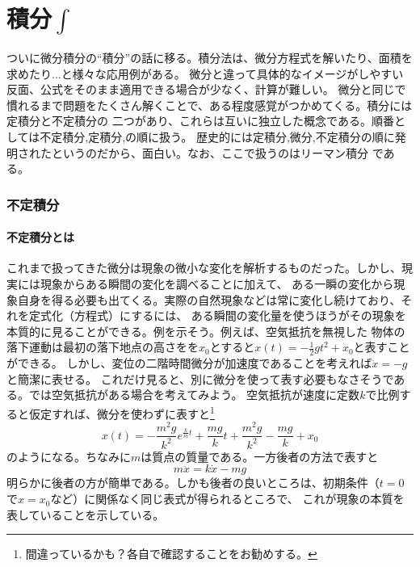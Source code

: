 \documentclass[a4j,dvipdfmx]{jsarticle}
\newcommand{\linktoMOKUZI}{\vspace{\stretch{1}}\fbox{\centerline{\hyperref[目次]{目次に戻る}}}}
\begin{document}
            \linktoMOKUZI
    \clearpage

    \part{積分$\int$}
        \begin{screen}
            ついに微分積分の``積分''の話に移る。積分法は、微分方程式を解いたり、面積を求めたり...と様々な応用例がある。
            微分と違って具体的なイメージがしやすい反面、公式をそのまま適用できる場合が少なく、計算が難しい。
            微分と同じで慣れるまで問題をたくさん解くことで、ある程度感覚がつかめてくる。積分には定積分と不定積分の
            二つがあり、これらは互いに独立した概念である。順番としては不定積分,定積分,の順に扱う。
            歴史的には定積分,微分,不定積分の順に発明されたというのだから、面白い。なお、ここで扱うのはリーマン積分
            である。
        \end{screen}
        \clearpage
        \section{不定積分}
            \subsection{不定積分とは}
                これまで扱ってきた微分は現象の微小な変化を解析するものだった。しかし、現実には現象からある瞬間の変化を調べることに加えて、
                ある一瞬の変化から現象自身を得る必要も出てくる。実際の自然現象などは常に変化し続けており、それを定式化（方程式）にするには、
                ある瞬間の変化量を使うほうがその現象を本質的に見ることができる。例を示そう。例えば、空気抵抗を無視した
                物体の落下運動は最初の落下地点の高さをを$x_0$とすると$x(t)=-\frac{1}{2}gt^2+x_0$と表すことができる。
                しかし、変位の二階時間微分が加速度であることを考えれば$\ddot{x}=-g$と簡潔に表せる。
                これだけ見ると、別に微分を使って表す必要もなさそうである。では空気抵抗がある場合を考えてみよう。
                空気抵抗が速度に定数$k$で比例すると仮定すれば、微分を使わずに表すと\footnote{間違っているかも？各自で確認することをお勧めする。}
                \begin{equation}
                    x(t)=-\frac{m^2g}{k^2}e^{\frac{k}{m}t}+\frac{mg}{k}t+\frac{m^2g}{k^2}-\frac{mg}{k}+x_0
                \end{equation}
                のようになる。ちなみに$m$は質点の質量である。一方後者の方法で表すと
                \begin{equation}
                    m\ddot{x}=k\dot{x}-mg\label{eq:空気抵抗ありのときの落下運動}
                \end{equation}
                明らかに後者の方が簡単である。しかも後者の良いところは、初期条件（$t=0$で$x=x_0$など）に関係なく同じ表式が得られるところで、
                これが現象の本質を表していることを示している。
\end{document}
